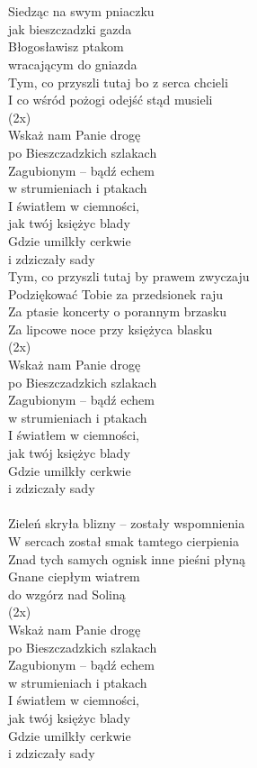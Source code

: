 \begin{text}
\vin \\
\vin \\
Siedząc na swym pniaczku\\
jak bieszczadzki gazda\\
Błogosławisz ptakom\\
wracającym do gniazda\\
Tym, co przyszli tutaj bo z serca chcieli\\
I co wśród pożogi odejść stąd musieli\\

(2x)\\
Wskaż nam Panie drogę\\
po Bieszczadzkich szlakach\\
Zagubionym – bądź echem\\
w strumieniach i ptakach\\
I światłem w ciemności,\\
jak twój księżyc blady\\
Gdzie umilkły cerkwie\\
i zdziczały sady\\

Tym, co przyszli tutaj by prawem zwyczaju\\
Podziękować Tobie za przedsionek raju\\
Za ptasie koncerty o porannym brzasku\\
Za lipcowe noce przy księżyca blasku\\

(2x)\\
Wskaż nam Panie drogę\\
po Bieszczadzkich szlakach\\
Zagubionym – bądź echem\\
w strumieniach i ptakach\\
I światłem w ciemności,\\
jak twój księżyc blady\\
Gdzie umilkły cerkwie\\
i zdziczały sady\\

\vin \\
Zieleń skryła blizny – zostały wspomnienia\\
W sercach został smak tamtego cierpienia\\
Znad tych samych ognisk inne pieśni płyną\\
Gnane ciepłym wiatrem\\
do wzgórz nad Soliną\\

(2x)\\
Wskaż nam Panie drogę\\
po Bieszczadzkich szlakach\\
Zagubionym – bądź echem\\
w strumieniach i ptakach\\
I światłem w ciemności,\\
jak twój księżyc blady\\
Gdzie umilkły cerkwie\\
i zdziczały sady\\
\end{text}
